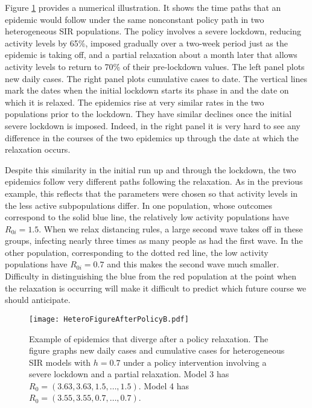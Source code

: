 \documentclass[11pt]{article}
\begin{document}
Figure \ref{f:policy} provides a numerical illustration. It shows the time paths that an epidemic would follow under the same nonconstant policy path in two heterogeneous SIR populations. 
The policy involves a severe lockdown, reducing activity levels by 65\%, imposed gradually over a two-week period just as the epidemic is taking off, and a partial relaxation about a month later that allows activity levels to return to 
70\% of their pre-lockdown values. The left panel plots new daily cases. The right panel plots cumulative cases to date. The vertical lines mark the dates when the initial lockdown starts its phase in and the date on which it is relaxed. 
The epidemics rise at very similar rates in the two populations prior to the lockdown. They have similar declines once the initial severe lockdown is imposed. Indeed, in the right panel it is very hard to see any difference in the courses of the two epidemics up through the date at which the relaxation occurs.

Despite this similarity in the initial run up and through the lockdown, the two epidemics follow very different paths following the relaxation. As in the previous example, this reflects that the parameters were chosen so that activity levels in the  less active subpopulations differ.
In one population, whose outcomes correspond to the solid blue line, the relatively low activity populations have $R_{0i} = 1.5$. When we relax
distancing rules, a large second wave takes off in
these groups, infecting nearly three times as many people as had the first wave. In the other population, corresponding to the dotted red line,
the low activity populations have $R_{0i}=0.7$
and this makes the second wave much smaller. Difficulty in distinguishing the blue from the red population at the point when the relaxation is occurring will make it difficult to predict which
future course we should anticipate.

\begin{figure}[htbp]
\noindent
\begin{center}
\texttt{[image: HeteroFigureAfterPolicyB.pdf]}
\end{center}
\caption{Example of epidemics that diverge after a policy relaxation. The figure graphs new daily cases 
and cumulative cases for heterogeneous SIR models  with $h=0.7$ under a policy intervention involving a severe lockdown and a partial relaxation. Model 3 has $R_0 = (3.63, 3.63, 1.5, \ldots, 1.5).$ Model 4 has
$R_0 = (3.55, 3.55, 0.7, \ldots, 0.7)$.}
\label{f:policy}
\end{figure}
\end{document}
